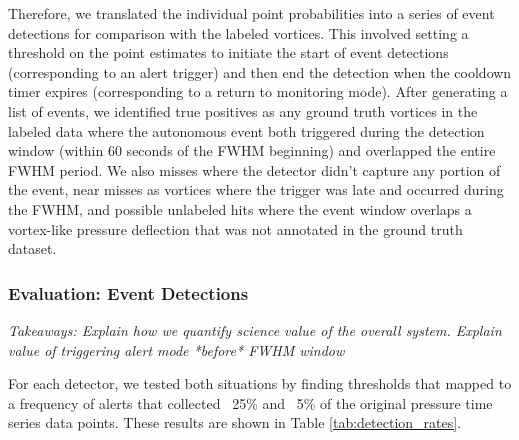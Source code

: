 Therefore, we translated the individual point probabilities into a series of event detections for comparison with the labeled vortices. 
This involved setting a threshold on the point estimates to initiate the start of event detections (corresponding to an alert trigger) and then end the detection when the cooldown timer expires (corresponding to a return to monitoring mode). 
After generating a list of events, we identified true positives as any ground truth vortices in the labeled data where the autonomous event both triggered during the detection window (within 60 seconds of the \acrshort{FWHM} beginning) and overlapped the entire \acrshort{FWHM} period. 
We also misses where the detector didn't capture any portion of the event, near misses as vortices where the trigger was late and occurred during the \acrshort{FWHM}, and possible unlabeled hits where the event window overlaps a  vortex-like pressure deflection that was not annotated in the ground truth dataset.


\subsubsection{Evaluation: Event Detections}
\label{subsec:evaluation_event_detections_methods}
\textit{Takeaways: Explain how we quantify science value of the overall system. Explain value of triggering alert mode *before* FWHM window}

For each detector, we tested both situations by finding thresholds that mapped to a frequency of alerts that collected ~25\% and ~5\% of the original pressure time series data points. 
These results are shown in Table \ref{tab:detection_rates}.


